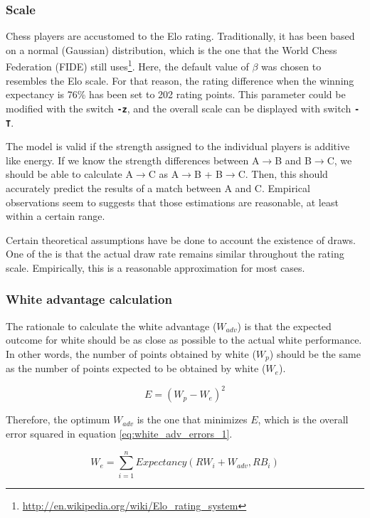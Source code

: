 \documentclass[12pt]{article}
\newcommand{\swtch} [1] {\texttt{\textbf{#1}}}
\begin{document}
\subsubsection*{Scale}

Chess players are accustomed to the Elo rating. 
Traditionally, it has been based on a normal (Gaussian) distribution, which is the one that the World Chess Federation (FIDE) still uses\footnote{\url{http://en.wikipedia.org/wiki/Elo_rating_system}}.
Here, the default value of $\beta$ was chosen to resembles the Elo scale.  
For that reason, the rating difference when the winning expectancy is 76\% has been set to 202 rating points.
This parameter could be modified with the switch \swtch{-z}, and the overall scale can be displayed with switch \swtch{-T}.

The model is valid if the strength assigned to the individual players is additive like energy. 
If we know the strength differences between A$\to$B and B$\to$C, we should be able to calculate A$\to$C as A$\to$B + B$\to$C.
Then, this should accurately predict the results of a match between A and C. 
Empirical observations seem to suggests that those estimations are reasonable, at least within a certain range. 

Certain theoretical assumptions have be done to account the existence of draws. 
One of the is that the actual draw rate remains similar throughout the rating scale.
Empirically, this is a reasonable approximation for most cases.

\subsubsection*{White advantage calculation}

The rationale to calculate the white advantage ($W_{adv}$) is that the expected outcome for white should be as close as possible to the actual white performance.
In other words, the number of points obtained by white ($W_{p}$) should be the same as the number of points expected to be obtained by white ($W_{e}$).

	\begin{equation} \label{eq:white_adv_errors_1}
	E = (W_{p} - W_{e})^2
	\end{equation}

Therefore, the optimum $W_{adv}$ is the one that minimizes $E$, which is the overall error squared in equation \ref{eq:white_adv_errors_1}.

	\begin{equation} \label{eq:white_adv_errors_1b}
	W_{e} = \sum\limits_{i=1}^n Expectancy(RW_{i} + W_{adv}, RB_{i})
	\end{equation}
\end{document}

